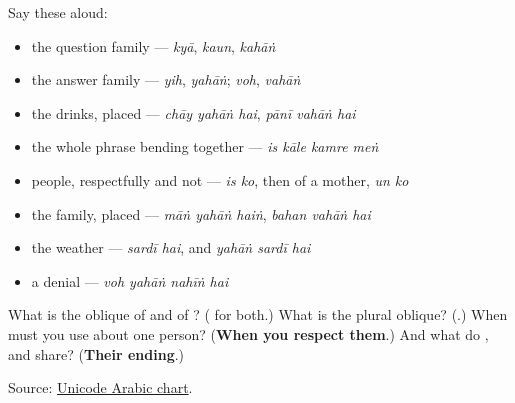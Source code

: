 Say these aloud:

\begin{itemize}
\raggedright
  \item the question family — \emph{kyā}, \emph{kaun}, \emph{kahāṅ}
  \item the answer family — \emph{yih}, \emph{yahāṅ}; \emph{voh}, \emph{vahāṅ}
  \item the drinks, placed — \emph{chāy yahāṅ hai}, \emph{pānī vahāṅ hai}
  \item the whole phrase bending together — \emph{is kāle kamre meṅ}
  \item people, respectfully and not — \emph{is ko}, then of a mother, \emph{un ko}
  \item the family, placed — \emph{māṅ yahāṅ haiṅ}, \emph{bahan vahāṅ hai}
  \item the weather — \emph{sardī hai}, and \emph{yahāṅ sardī hai}
  \item a denial — \emph{voh yahāṅ nahīṅ hai}
\end{itemize}

\begin{tcolorbox}[breakable,colback=teal!4,colframe=teal!35!black,title={Before you move on}]
What is the oblique of \textbf{} and of \textbf{}? (\textbf{} for both.) What is the plural oblique? (\textbf{}.) When must you use \textbf{} about one person? (\textbf{When you respect them}.) And what do \textbf{}, \textbf{} and \textbf{} share? (\textbf{Their ending}.)

Source: \href{https://www.unicode.org/charts/PDF/U0600.pdf}{Unicode Arabic chart}.
\end{tcolorbox}
